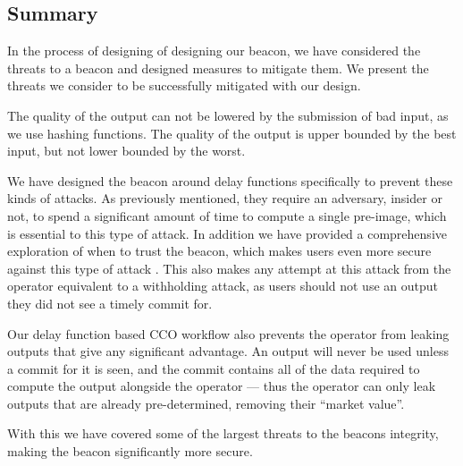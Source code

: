 \subsection{Summary}
In the process of designing of designing our beacon, we have considered the threats to a beacon and designed measures to mitigate them. We present the threats we consider to be successfully mitigated with our design.

The quality of the output can not be lowered by the submission of bad input, as we use hashing functions. The quality of the output is upper bounded by the best input, but not lower bounded by the worst.

We have designed the beacon around delay functions specifically to prevent these kinds of attacks. As previously mentioned, they require an adversary, insider or not, to spend a significant amount of time to compute a single pre-image, which is essential to this type of attack. In addition we have provided a comprehensive exploration of when to trust the beacon, which makes users even more secure against this type of attack .
This also makes any attempt at this attack from the operator equivalent to a withholding attack, as users should not use an output they did not see a timely commit for.

Our delay function based CCO workflow also prevents the operator from leaking outputs that give any significant advantage. An output will never be used unless a commit for it is seen, and the commit contains all of the data required to compute the output alongside the operator --- thus the operator can only leak outputs that are already pre-determined, removing their \enquote{market value}.

With this we have covered some of the largest threats to the beacons integrity, making the beacon significantly more secure.
